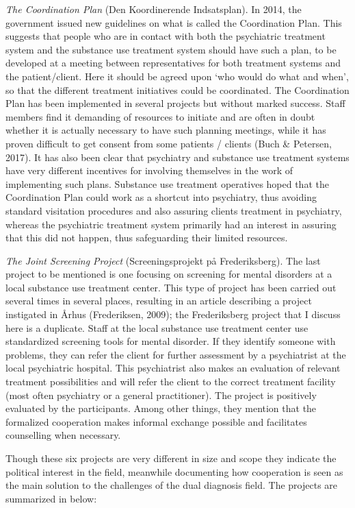 \begin{multicols}{2}
\textit{The Coordination Plan} (Den Koordinerende Indsatsplan). In 2014, the government issued new guidelines on what is called the Coordination Plan. This suggests that people who are in contact with both the psychiatric treatment system and the substance use treatment system should have such a plan, to be developed at a meeting between representatives for both treatment systems and the patient/client. Here it should be agreed upon ‘who would do what and when’, so that the different treatment initiatives could be coordinated. The Coordination Plan has been implemented in several projects but without marked success. Staff members find it demanding of resources to initiate and are often in doubt whether it is actually necessary to have such planning meetings, while it has proven difficult to get consent from some patients / clients (Buch \& Petersen, 2017). It has also been clear that psychiatry and substance use treatment systems have very different incentives for involving themselves in the work of implementing such plans. Substance use treatment operatives hoped that the Coordination Plan could work as a shortcut into psychiatry, thus avoiding standard visitation procedures and also assuring clients treatment in psychiatry, whereas the psychiatric treatment system primarily had an interest in assuring that this did not happen, thus safeguarding their limited resources. \par
\textit{The Joint Screening Project} (Screeningsprojekt på Frederiksberg). The last project to be mentioned is one focusing on screening for mental disorders at a local substance use treatment center. This type of project has been carried out several times in several places, resulting in an article describing a project instigated in Århus (Frederiksen, 2009); the Frederiksberg project that I discuss here is a duplicate. Staff at the local substance use treatment center use standardized screening tools for mental disorder. If they identify someone with problems, they can refer the client for further assessment by a psychiatrist at the local psychiatric hospital. This psychiatrist also makes an evaluation of relevant treatment possibilities and will refer the client to the correct treatment facility (most often psychiatry or a general practitioner). The project is positively evaluated by the participants. Among other things, they mention that the formalized cooperation makes informal exchange possible and facilitates counselling when necessary.
\par
Though these six projects are very different in size and scope they indicate the political interest in the field, meanwhile documenting how cooperation is seen as the main solution to the challenges of the dual diagnosis field. The projects are summarized in  below:
    \end{multicols}
